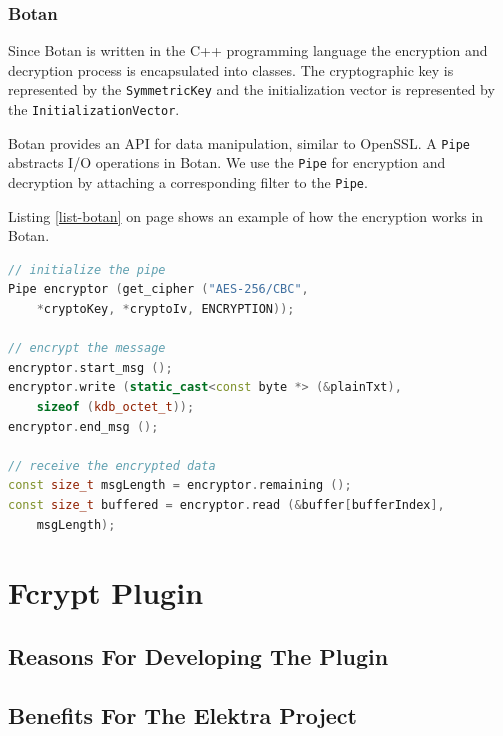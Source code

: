 \subsubsection*{Botan}

Since Botan is written in the C++ programming language the encryption and decryption process is encapsulated into classes.
The cryptographic key is represented by the \texttt{SymmetricKey} and the initialization vector is represented by the \texttt{InitializationVector}.

Botan provides an API for data manipulation, similar to OpenSSL.
A \texttt{Pipe} abstracts I/O operations in Botan.
We use the \texttt{Pipe} for encryption and decryption by attaching a corresponding filter to the \texttt{Pipe}. 

Listing \ref{list-botan} on page \pageref{list-botan} shows an example of how the encryption works in Botan.

\begin{lstlisting}[label=list-botan,language=C++,caption={Encryption in the Botan crypto plugin variant}]
// initialize the pipe
Pipe encryptor (get_cipher ("AES-256/CBC", 
	*cryptoKey, *cryptoIv, ENCRYPTION));

// encrypt the message
encryptor.start_msg ();
encryptor.write (static_cast<const byte *> (&plainTxt), 
	sizeof (kdb_octet_t));
encryptor.end_msg ();

// receive the encrypted data
const size_t msgLength = encryptor.remaining ();
const size_t buffered = encryptor.read (&buffer[bufferIndex], 
	msgLength);
\end{lstlisting}


\section{Fcrypt Plugin}
\label{fcrypt-plugin}

\subsection{Reasons For Developing The Plugin}


\subsection{Benefits For The Elektra Project}

